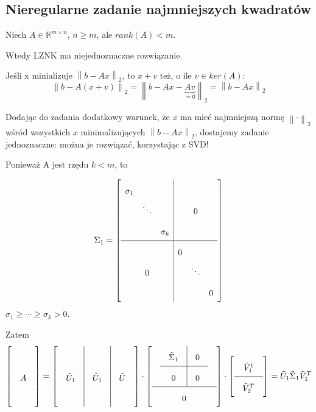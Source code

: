 \documentclass[hidelinks,a4paper,fleqn,oneside]{book}
\newcommand{\RR}{\mathbb{R}}
\newcommand{\norm}[1]{\left\lVert#1\right\rVert}
\begin{document}
\subsection{Nieregularne zadanie najmniejszych kwadratów}

Niech $A \in \RR^{m \times n}$, $n \geq m$, ale $rank(A) < m$.

Wtedy LZNK ma niejednoznaczne rozwiązanie.

Jeśli x minializuje $\norm{b - Ax}_2$, to $x+v$ też, o ile $v \in ker(A)$:
\[
	\norm{b - A(x + v)}_2 = \norm{b - Ax - \underbrace{Av}_{=0}}_2 = \norm{b - Ax}_2
\]

Dodając do zadania dodatkowy warunek, że $x$ ma mieć najmniejszą normę $\norm{\cdot}_2$ wśród wszystkich $x$ minimalizujących $\norm{b - Ax}_2$, dostajemy zadanie jednoznaczne: można je rozwiązać, korzystając z SVD!

Ponieważ A jest rzędu $k<m$, to 

\[
	\Sigma_1 = \left[ \begin{array}{ccc|ccc}
		\sigma_1 &  &  &  &  & \\ 
		&  \ddots &  &  & 0  & \\ 
		&  & \sigma_k  &  &  & \\ 
		\hline
		&  & &  0 &  & \\ 
		&  0 &  &  & \ddots & \\ 
		&  &  &  &  & 0
	\end{array} \right]
\]
$\sigma_1 \geq \cdots \geq \sigma_k > 0$.

Zatem
\[\arraycolsep=1em\def\arraystretch{2}
	\left[\begin{array}{c} \\ A \\ \ \end{array}\right] =
	\left[\begin{array}{c|c|c} & &\ \\ \tilde{U}_1 & \hat{U}_1 & \tilde{U} \\ & & \ \end{array}\right] \cdot \left[ \begin{array}{c} \begin{array}{c|c} \tilde{\Sigma}_1 & 0 \\ \hline 0 & 0 \end{array} \\ \hline 0\end{array}\right] \cdot \left[ \begin{array}{c} \tilde{V}_1^t \\ \hline \tilde{V}_2^T \end{array}\right] = \tilde{U}_1 \tilde{\Sigma}_1 \tilde{V}_1^T
\]
\end{document}
